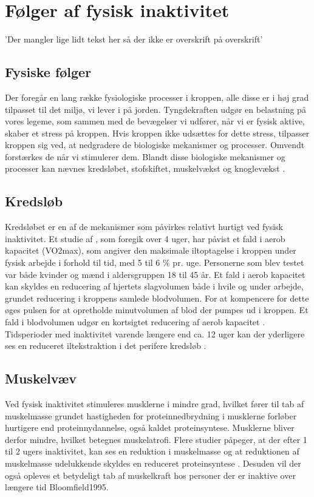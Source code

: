 \section{Følger af fysisk inaktivitet}
'Der mangler lige lidt tekst her så der ikke er overskrift på overskrift'

\subsection{Fysiske følger}
Der foregår en lang række fysiologiske processer i kroppen, alle disse er i høj grad tilpasset til det miljø, vi lever i på jorden. 
Tyngdekraften udgør en belastning på vores legeme, som sammen med de bevægelser vi udfører, når vi er fysisk aktive, skaber et stress på kroppen. 
Hvis kroppen ikke udsættes for dette stress, tilpasser kroppen sig ved, at nedgradere de biologiske mekanismer og processer. Omvendt forstærkes de når vi stimulerer dem. 
Blandt disse biologiske mekanismer og processer kan nævnes kredsløbet, stofskiftet, muskelvækst og knoglevækst \citep{motionsraad2007}.

\subsection{Kredsløb}
Kredsløbet er en af de mekanismer som påvirkes relativt hurtigt ved fysisk inaktivitet. 
Et studie af \citeauthor{Convertino1995}, som foregik over 4 uger, har påvist et fald i aerob kapacitet (VO2max), som angiver den maksimale iltoptagelse i kroppen under fysisk arbejde i forhold til tid, med 5 til 6 \% pr. uge. 
Personerne som blev testet var både kvinder og mænd i aldersgruppen 18 til 45 år. 
Et fald i aerob kapacitet kan skyldes en reducering af hjertets slagvolumen både i hvile og under arbejde, grundet reducering i kroppens samlede blodvolumen. 
For at kompencere for dette øges pulsen for at opretholde minutvolumen af blod der pumpes ud i kroppen. 
Et fald i blodvolumen udgør en kortsigtet reducering af aerob kapacitet \citep{Convertino1995}. 
Tidsperioder med inaktivitet varende længere end ca. 12 uger kan der yderligere ses en reduceret iltekstraktion i det perifere kredsløb \citep{Coyle1985}.

\subsection{Muskelvæv}
Ved fysisk inaktivitet stimuleres musklerne i mindre grad, hvilket fører til tab af muskelmasse grundet hastigheden for proteinnedbrydning i musklerne forløber hurtigere end proteinnydannelse, også kaldet proteinsyntese. 
Musklerne bliver derfor mindre, hvilket betegnes muskelatrofi. 
Flere studier påpeger, at der efter 1 til 2 ugers inaktivitet, kan ses en reduktion i muskelmasse og at reduktionen af muskelmasse udelukkende skyldes en reduceret proteinsyntese \citep{Douglas2006, Bloomsfield1995}. 
Desuden vil der også opleves et betydeligt tab af muskelkraft hos personer der er inaktive over længere tid {Bloomfield1995}. 

